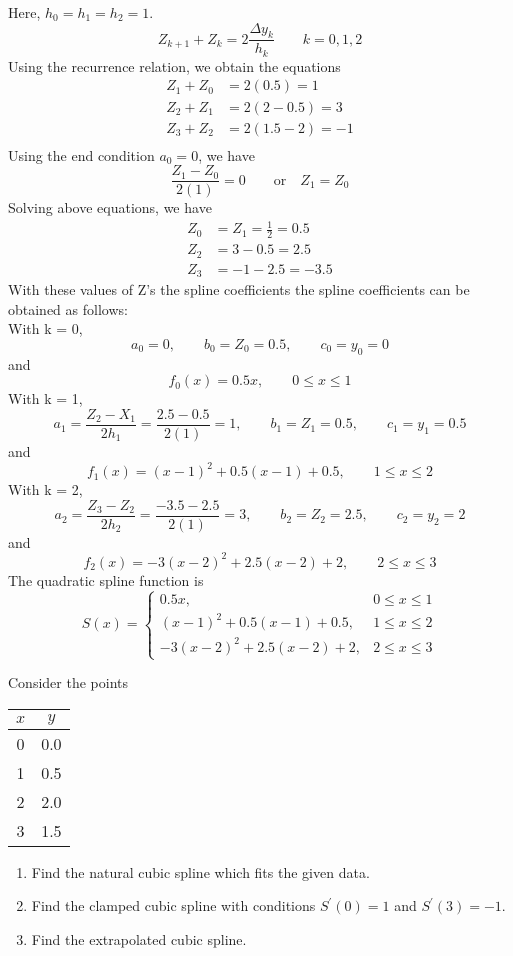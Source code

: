 \documentclass[12pt,class=book,crop=false]{standalone}
\begin{document}
\begin{soln}
	Here,  $ h_0=h_1=h_2=1 $.
	\[
		Z_{k+1}+Z_k=2 \frac{\Delta y_k}{h_k}\qquad k = 0, 1, 2   
	\]
	Using the recurrence relation, we obtain the equations
	\begin{align*}
		Z_1+Z_0&=2(0.5)=1\\
		Z_2+Z_1&=2(2-0.5)=3\\
		Z_3+Z_2&=2(1.5-2)=-1\\
	\end{align*}
	Using the end condition $ a_0=0 $, we have
	\[
		\frac{Z_1-Z_0}{2(1)}=0\qquad \text{or}\quad Z_1=Z_0
	\]
	Solving above equations, we have
	\begin{align*}
		Z_0&=Z_1=\frac{1}{2}=0.5\\
		Z_2&=3-0.5=2.5\\
		Z_3&=-1-2.5=-3.5
	\end{align*}
	With these values of Z's the spline coefficients the spline coefficients can be obtained as follows:\\
	With k = 0,
	\[
		a_0=0,\qquad b_0=Z_0=0.5,\qquad c_0=y_0=0
	\]
	and
	\[
		f_0 (x)=0.5x,\qquad 0 \leq x \leq 1
	\]
	With k = 1,
	\[
		a_1=\frac{Z_2-X_1}{2h_1}=\frac{2.5-0.5}{2(1)}=1,\qquad b_1=Z_1=0.5,\qquad c_1=y_1=0.5
	\]
	and
	\[
		f_1 (x)=(x-1)^2+0.5(x-1)+0.5,\qquad 1 \leq x \leq 2
	\]
	With k = 2,
	\[
		a_2=\frac{Z_3-Z_2}{2h_2}=\frac{-3.5-2.5}{2(1)}=3,\qquad b_2=Z_2=2.5,\qquad c_2=y_2=2
	\]
	and
	\[
		f_2 (x)=-3(x-2)^2+2.5(x-2)+2,\qquad 2 \leq x \leq 3
	\]
	The quadratic spline function is
	\[
		S(x)=\begin{cases}
			0.5x, &0 \leq x \leq 1\\
			(x-1)^2+0.5(x-1)+0.5,& 1 \leq x \leq 2\\
			-3(x-2)^2+2.5(x-2)+2, &2 \leq x \leq 3
		\end{cases}
	\]
\end{soln}
\begin{prob}
	Consider the points
	\begin{table}[H]
		\centering
		\begin{tabular}{cc}
			\toprule
			$ x $	&
			$ y $	\\\midrule
			0	&
			0.0	\\
			1	&
			0.5	\\
			2	&
			2.0	\\
			3&
			1.5\\\bottomrule
		\end{tabular}
	\end{table}
	\begin{enumerate}[label=(\alph*)]
		\item Find the natural cubic spline which fits the given data.
		\item Find the clamped cubic spline with conditions $ S^{'} (0)=1 $ and $ S^{'} (3)=-1 $.
		\item Find the extrapolated cubic spline.
	\end{enumerate}	
\end{prob}
\end{document}
